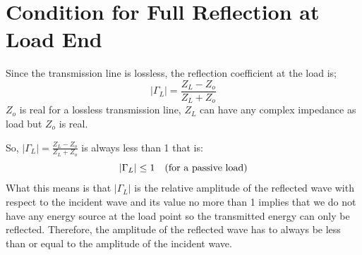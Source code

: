\section{Condition for Full Reflection at Load End}
Since the transmission line is lossless, the reflection coefficient at the load is;
\begin{equation*}
|\Gamma_L| = \frac{Z_L-Z_o}{Z_L+Z_o}
\end{equation*}
$Z_o$ is real for a lossless transmission line, $Z_L$ can have any complex impedance as load but $Z_o$ is real.

So, $	|\Gamma_L| = \frac{Z_L-Z_o}{Z_L+Z_o}$ is always less than 1 that is:
\begin{equation*}
|\Gamma_L|\leq 1\quad  (\textnormal{for  a  passive load})
\end{equation*}
What this means is that $|\Gamma_L|$ is the relative amplitude of the reflected wave with respect to the incident wave and its value no more than 1 implies that we do not have any energy source at the load point so the transmitted energy  can only be reflected. Therefore, the amplitude of the reflected wave has to always be less than or equal to the amplitude of the incident wave.

